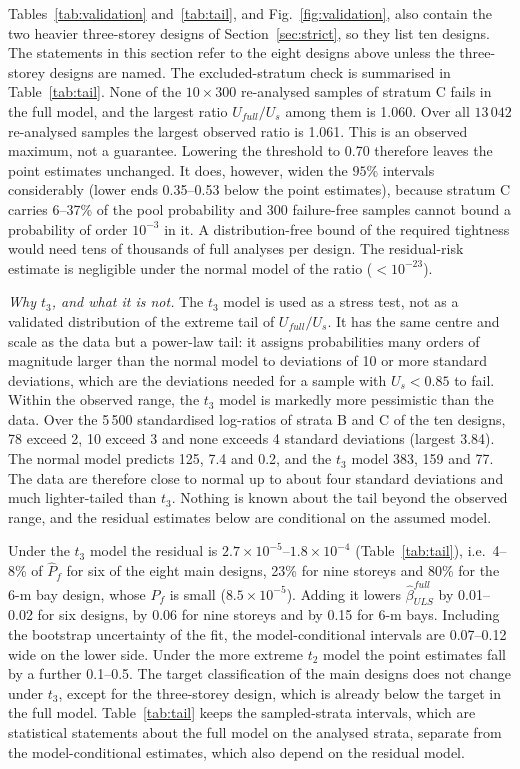 Tables~\ref{tab:validation} and~\ref{tab:tail}, and Fig.~\ref{fig:validation}, also contain the two heavier three-storey designs of
Section~\ref{sec:strict}, so they list ten designs. The statements in this section refer to the
eight designs above unless the three-storey designs are named. The excluded-stratum check is
summarised in Table~\ref{tab:tail}. None of the $10\times300$ re-analysed samples of stratum C
fails in the full model, and the largest ratio $U_{full}/U_s$ among them is 1.060. Over all
$13\,042$ re-analysed samples the largest observed ratio is 1.061. This
is an observed maximum, not a guarantee. Lowering the threshold to 0.70 therefore leaves the point
estimates unchanged. It does, however, widen the $95\%$ intervals considerably (lower ends
0.35--0.53 below the point estimates), because stratum C carries 6--37\% of the pool probability and
300 failure-free samples cannot bound a probability of order $10^{-3}$ in it. A distribution-free
bound of the required tightness would need tens of thousands of full analyses per design. The
residual-risk estimate is negligible under the normal model of the ratio ($<10^{-23}$).

\emph{Why $t_3$, and what it is not.} The $t_3$ model is used as a stress test, not as a validated
distribution of the extreme tail of $U_{full}/U_s$. It has the same centre and scale as the data but
a power-law tail: it assigns probabilities many orders of magnitude larger than the normal model to
deviations of 10 or more standard deviations, which are the deviations needed for a sample with
$U_s<0.85$ to fail. Within the observed range, the $t_3$ model is markedly more pessimistic than the
data. Over the 5\,500 standardised log-ratios of strata B and C of the ten designs, 78 exceed 2,
10 exceed 3 and none exceeds 4 standard deviations (largest 3.84). The normal model predicts 125,
7.4 and 0.2, and the $t_3$ model 383, 159 and 77. The data are therefore close to normal up to about
four standard deviations and much lighter-tailed than $t_3$. Nothing is known about the tail beyond
the observed range, and the residual estimates below are conditional on the assumed model.

Under the $t_3$ model the residual is $2.7\times10^{-5}$--$1.8\times10^{-4}$ (Table~\ref{tab:tail}),
i.e.\ 4--8\% of $\hat P_f$ for six of the eight main designs, 23\% for nine storeys and 80\% for the
6-m bay design, whose $P_f$ is small ($8.5\times10^{-5}$). Adding it lowers
$\hat\beta^{full}_{ULS}$ by 0.01--0.02 for six designs, by 0.06 for nine storeys and by 0.15 for 6-m
bays. Including the bootstrap uncertainty of the fit, the model-conditional intervals are 0.07--0.12 wide
on the lower side. Under the more extreme $t_2$ model the point estimates fall by a further 0.1--0.5. The target
classification of the main designs does not change under $t_3$, except for the three-storey design,
which is already below the target in the full model. Table~\ref{tab:tail} keeps the sampled-strata
intervals, which are statistical statements about the full model on the analysed strata, separate
from the model-conditional estimates, which also depend on the residual model.

